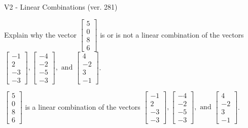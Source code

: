 \begin{exercise}
  \begin{exerciseTitle}V2 - Linear Combinations (ver. 281)\end{exerciseTitle}
  \begin{exerciseStatement}
    Explain why the vector \(\left[\begin{array}{c}
5 \\
0 \\
8 \\
6
\end{array}\right]\)  is or is not a linear 
	combination of the vectors \(\left[\begin{array}{c}
-1 \\
2 \\
-3 \\
-3
\end{array}\right] , \left[\begin{array}{c}
-4 \\
-2 \\
-5 \\
-3
\end{array}\right] , \text{ and } \left[\begin{array}{c}
4 \\
-2 \\
3 \\
-1
\end{array}\right]\).
	


  \end{exerciseStatement}
  \begin{exerciseAnswer}
   \(\left[\begin{array}{c}
5 \\
0 \\
8 \\
6
\end{array}\right]\) 
  	 is  
	a linear combination of the vectors \(\left[\begin{array}{c}
-1 \\
2 \\
-3 \\
-3
\end{array}\right] , \left[\begin{array}{c}
-4 \\
-2 \\
-5 \\
-3
\end{array}\right] , \text{ and } \left[\begin{array}{c}
4 \\
-2 \\
3 \\
-1
\end{array}\right]\).

	
  


  \end{exerciseAnswer}
\end{exercise}